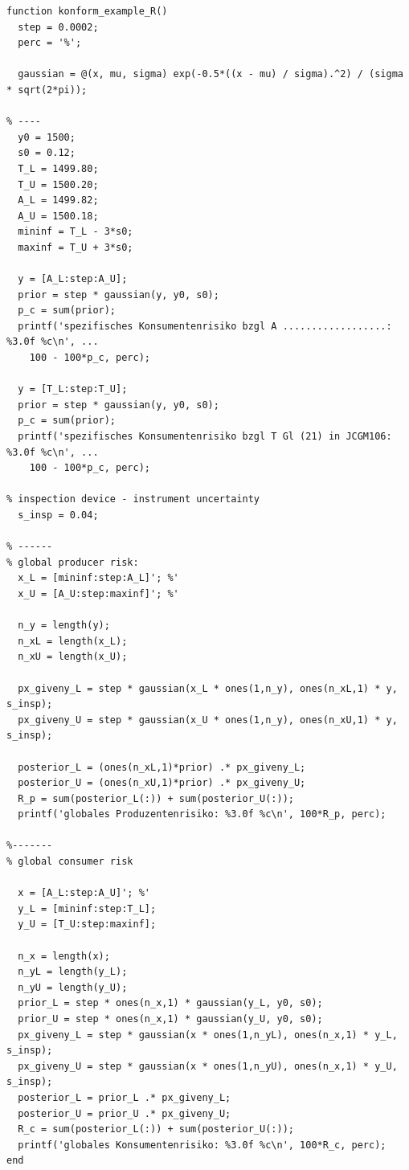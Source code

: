 \begin{lstlisting}[style=Matlab]
  function konform_example_R()
  step = 0.0002;
  perc = '%';

  gaussian = @(x, mu, sigma) exp(-0.5*((x - mu) / sigma).^2) / (sigma * sqrt(2*pi));

% ----
  y0 = 1500;
  s0 = 0.12;
  T_L = 1499.80;
  T_U = 1500.20;
  A_L = 1499.82;
  A_U = 1500.18;
  mininf = T_L - 3*s0;
  maxinf = T_U + 3*s0;

  y = [A_L:step:A_U];
  prior = step * gaussian(y, y0, s0);
  p_c = sum(prior);
  printf('spezifisches Konsumentenrisiko bzgl A ..................: %3.0f %c\n', ...
    100 - 100*p_c, perc);

  y = [T_L:step:T_U];
  prior = step * gaussian(y, y0, s0);
  p_c = sum(prior);
  printf('spezifisches Konsumentenrisiko bzgl T Gl (21) in JCGM106: %3.0f %c\n', ...
    100 - 100*p_c, perc);

% inspection device - instrument uncertainty
  s_insp = 0.04;

% ------
% global producer risk:
  x_L = [mininf:step:A_L]'; %'
  x_U = [A_U:step:maxinf]'; %'

  n_y = length(y);
  n_xL = length(x_L);
  n_xU = length(x_U);

  px_giveny_L = step * gaussian(x_L * ones(1,n_y), ones(n_xL,1) * y, s_insp);
  px_giveny_U = step * gaussian(x_U * ones(1,n_y), ones(n_xU,1) * y, s_insp);

  posterior_L = (ones(n_xL,1)*prior) .* px_giveny_L;
  posterior_U = (ones(n_xU,1)*prior) .* px_giveny_U;
  R_p = sum(posterior_L(:)) + sum(posterior_U(:));
  printf('globales Produzentenrisiko: %3.0f %c\n', 100*R_p, perc);

%-------
% global consumer risk

  x = [A_L:step:A_U]'; %'
  y_L = [mininf:step:T_L];
  y_U = [T_U:step:maxinf];

  n_x = length(x);
  n_yL = length(y_L);
  n_yU = length(y_U);
  prior_L = step * ones(n_x,1) * gaussian(y_L, y0, s0);
  prior_U = step * ones(n_x,1) * gaussian(y_U, y0, s0);
  px_giveny_L = step * gaussian(x * ones(1,n_yL), ones(n_x,1) * y_L, s_insp);
  px_giveny_U = step * gaussian(x * ones(1,n_yU), ones(n_x,1) * y_U, s_insp);
  posterior_L = prior_L .* px_giveny_L;
  posterior_U = prior_U .* px_giveny_U;
  R_c = sum(posterior_L(:)) + sum(posterior_U(:));
  printf('globales Konsumentenrisiko: %3.0f %c\n', 100*R_c, perc);
end

\end{lstlisting}
